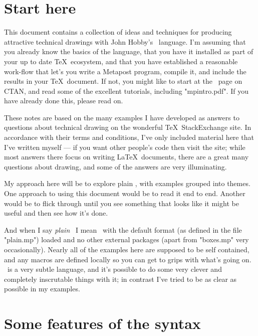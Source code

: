 \documentclass[a4paper,landscape]{article}
\begin{document}
\section{Start here}

This document contains a collection of ideas and techniques for producing attractive
technical drawings with John Hobby’s \MP\ language.  I’m assuming that you already
know the basics of the language, that you have it installed as part of your up to
date \TeX\ ecosystem, and that you have established a reasonable work-flow that
let’s you write a Metapost program, compile it, and include the results in your
\TeX\ document.  If not, you might like to start at the \MP\ page on CTAN, and read
some of the excellent tutorials, including "mpintro.pdf".  If you have already done
this, please read on.

These notes are based on the many examples I have developed as answers
to questions about technical drawing on the wonderful \TeX\ StackExchange site.  In
accordance with their terms and conditions, I’ve only included material here that
I’ve written myself --- if you want other people’s code then visit the site;
while most answers there focus on writing \LaTeX\ documents, there are a great
many questions about drawing, and some of the answers are very illuminating.  

My approach here will be to explore plain \MP, with examples grouped
into themes.  One approach to using this document would be to read it end to end.
Another would be to flick through until you see something that looks like it might
be useful and then see how it’s done. 

And when I say \textit{plain} \MP\ I mean \MP\ with the default format (as defined
in the file "plain.mp") loaded and no other external packages (apart from "boxes.mp"
very occasionally).  Nearly all of the examples here are supposed to be self
contained, and any macros are defined locally so you can get to grips with what’s
going on.  \MP\ is a very subtle language, and it’s possible to do some
very clever and completely inscrutable things with it;  in contrast I’ve tried to be
as clear as possible in my examples.

\newpage
\section{Some features of the syntax}
\end{document}
